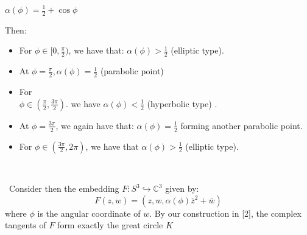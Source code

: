 \documentclass{amsart}
\begin{document}
$ \alpha(\phi) = \frac{1}{2} + \cos\phi$ 

Then: 
\begin{itemize}
\item For $\phi \in [0, \frac{\pi}{2})$, we have that: $\alpha(\phi) > \frac{1}{2}$ (elliptic type). \item At $\phi = \frac{\pi}{2}, \alpha(\phi) = \frac{1}{2}$ (parabolic point)
\item For \\$\phi \in (\frac{\pi}{2}, \frac{3\pi}{2})$. we have $\alpha(\phi) < \frac{1}{2}$ (hyperbolic type)
. \item At $\phi = \frac{3\pi}{2}$, we again have that: $\alpha(\phi) = \frac{1}{2}$  forming another parabolic point.
\item For  $\phi \in  (\frac{3\pi}{2}, 2\pi)$, we have that $\alpha(\phi) > \frac{1}{2}$ (elliptic type). 

\end{itemize} 
\par\ \par\
Consider then the embedding $F: S^3 \hookrightarrow \mathbb{C}^3$ given by:
$$ F(z,w) = (z, w, \alpha(\phi) \bar{z}^2 + \bar{w})$$
where $\phi$ is the angular coordinate of $w$. By our construction in [2], the complex tangents of  $F$ form exactly the great circle $K$ 
\par\ \par\
\end{document}
